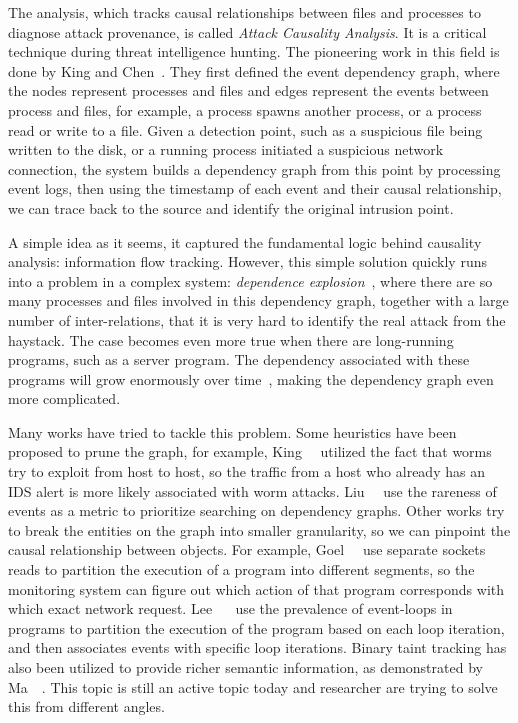 The analysis, which tracks causal relationships between files and 
processes to diagnose attack provenance, is called
\textit{Attack Causality Analysis}. It is a critical technique
during threat intelligence hunting. The pioneering work in this field
is done by King and Chen~\cite{king2003backtracking}. They first defined
the event dependency graph, where the nodes represent processes and files
and edges represent the events between process and files, for example,
a process spawns another process, or a process read or write to a 
file. Given a detection point, such as a suspicious file being written to 
the disk, or a running process initiated a suspicious network connection, 
the system builds a dependency graph from this point by
processing event logs, then using the timestamp of each event and 
their causal relationship, we can trace back to the source and identify
the original intrusion point.

A simple idea as it seems, it captured the fundamental logic behind 
causality analysis: information flow tracking. However, this simple
solution quickly runs into a problem in a complex system: 
\textit{dependence explosion}~\cite{goel2005taser}, where there are 
so many processes and files involved in this dependency graph, together
with a large number of inter-relations, that it is very hard to identify the
real attack from the haystack. The case becomes even more true when there
are long-running programs, such as a server program. The dependency 
associated with these programs will grow enormously over 
time~\cite{lee2013high}, making the dependency graph even more 
complicated.

Many works have tried to tackle this problem. Some heuristics have been 
proposed to prune the graph, for example, King~\etal~\cite{king2005enriching} 
utilized the fact that worms try to exploit from host to host,
so the traffic from a host who already has an IDS alert is more likely
associated with worm attacks. Liu~\etal~\cite{liu2018towards} use
the rareness of events as a metric to prioritize searching on dependency
graphs. Other works try to break the entities on the graph into smaller 
granularity, so we can pinpoint the causal relationship between objects.
For example, Goel~\etal~\cite{goel2005taser} use separate sockets
reads to partition the execution of a program into different segments, 
so the monitoring system can figure out which action of that program
corresponds with which exact network request. Lee ~\etal~\cite{lee2013high} use the prevalence of event-loops in programs to
partition the execution of the program based on each loop iteration,
and then associates events with specific loop iterations. Binary taint
tracking has also been utilized to provide richer semantic information, 
as demonstrated by Ma~\etal~\cite{ma2016protracer}. This topic is still an 
active topic today and researcher are trying to solve this from different
angles.